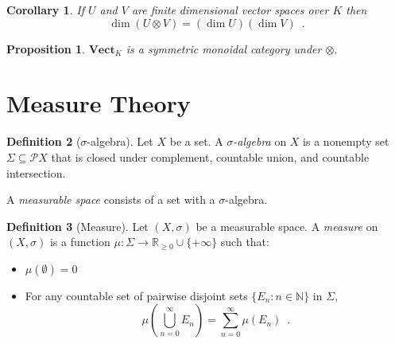 \documentclass{book}
\newtheorem{prop}{Proposition}[chapter]
\newtheorem{cor}{Corollary}[prop]
\theoremstyle{definition}
\newtheorem{df}[prop]{Definition}
\begin{document}
\begin{cor}
If $U$ and $V$ are finite dimensional vector spaces over $K$ then
\[ \dim (U \otimes V) = (\dim U)(\dim V) \enspace . \]
\end{cor}

\begin{prop}
$\mathbf{Vect}_K$ is a symmetric monoidal category under $\otimes$.
\end{prop}

\part{Measure Theory}

\begin{df}[$\sigma$-algebra]
Let $X$ be a set. A \emph{$\sigma$-algebra} on $X$ is a nonempty set $\Sigma \subseteq \mathcal{P} X$ that is closed under complement, countable union, and countable intersection.

A \emph{measurable space} consists of a set with a $\sigma$-algebra.
\end{df}

\begin{df}[Measure]
Let $(X, \sigma)$ be a measurable space. A \emph{measure} on $(X, \sigma)$ is a function $\mu : \Sigma \rightarrow \mathbb{R}_{\geq 0} \cup \{ + \infty \}$ such that:
\begin{itemize}
\item $\mu(\emptyset) = 0$
\item For any countable set of pairwise disjoint sets $\{ E_n : n \in \mathbb{N} \}$ in $\Sigma$,
\[ \mu \left( \bigcup_{n=0}^\infty E_n \right) = \sum_{n=0}^\infty \mu(E_n) \enspace . \]
\end{itemize}
\end{df}
\end{document}

